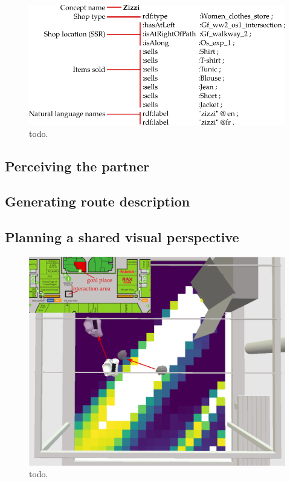 \begin{figure}[ht!]
\centering
\includegraphics[scale=0.45]{figures/chapter8/zizzi.png}
\caption{\label{fig:chap8_zizzi} todo. }
\end{figure}

\subsection{Perceiving the partner}

\subsection{Generating route description}

\subsection{Planning a shared visual perspective}

\begin{figure}[ht!]
\centering
\includegraphics[scale=0.25]{figures/chapter8/grid_map.png}
\caption{\label{fig:chap8_svp_grid} todo. }
\end{figure}

